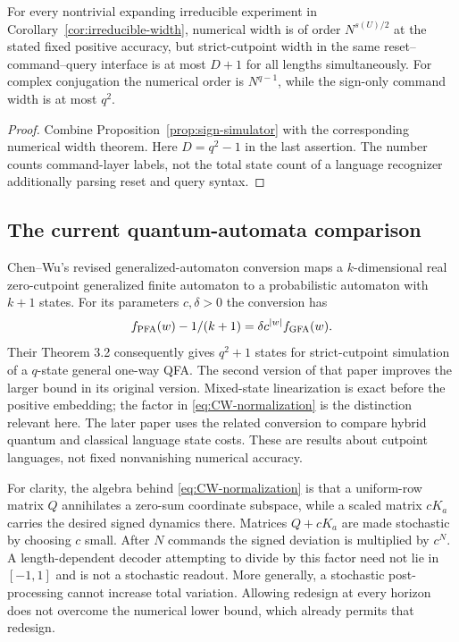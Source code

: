 \begin{corollary}
\label{cor:semantic-separation}
For every nontrivial expanding irreducible experiment in
Corollary~\ref{cor:irreducible-width}, numerical width is of order
$N^{s(U)/2}$ at the stated fixed positive accuracy, but strict-cutpoint
width in the same reset--command--query interface is at most $D+1$
for all lengths simultaneously. For complex conjugation the numerical
order is $N^{q-1}$, while the sign-only command width is at most $q^2$.
\end{corollary}
\begin{proof}
Combine Proposition~\ref{prop:sign-simulator} with the corresponding
numerical width theorem. Here $D=q^2-1$ in the last assertion.
The number counts command-layer labels, not the total state count of
a language recognizer additionally parsing reset and query syntax.
\end{proof}

\subsection{The current quantum-automata comparison}
Chen--Wu's revised generalized-automaton conversion
\cite[Proposition 3.1]{CWapr} maps a $k$-dimensional real
zero-cutpoint generalized finite automaton to a probabilistic automaton
with $k+1$ states. For its parameters $c,\delta>0$ the conversion has
\begin{equation}\label{eq:CW-normalization}
 f_{\rm PFA}(w)-1/(k+1)=\delta c^{|w|} f_{\rm GFA}(w).
\end{equation}
Their Theorem 3.2 consequently gives $q^2+1$ states for strict-cutpoint
simulation of a $q$-state general one-way QFA. The second version of
that paper improves the larger bound in its original version.
Mixed-state linearization is exact before the positive embedding;
the factor in \eqref{eq:CW-normalization} is the distinction relevant
here. The later paper \cite[Proposition 4 and Theorems 11--12]{CWmay}
uses the related conversion to compare hybrid quantum and classical
language state costs. These are results about cutpoint languages,
not fixed nonvanishing numerical accuracy.

For clarity, the algebra behind \eqref{eq:CW-normalization} is that a
uniform-row matrix $Q$ annihilates a zero-sum coordinate subspace,
while a scaled matrix $cK_a$ carries the desired signed dynamics
there. Matrices $Q+cK_a$ are made stochastic by choosing $c$ small.
After $N$ commands the signed deviation is multiplied by $c^N$.
A length-dependent decoder attempting to divide by this factor need
not lie in $[-1,1]$ and is not a stochastic readout. More generally,
a stochastic post-processing cannot increase total variation.
Allowing redesign at every horizon does not overcome the numerical
lower bound, which already permits that redesign.

